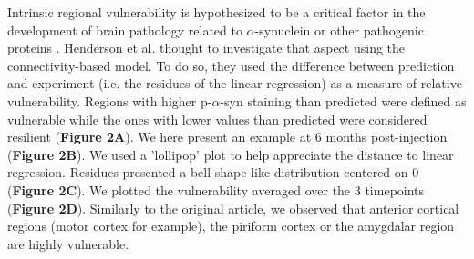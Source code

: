 Intrinsic regional vulnerability is hypothesized to be a critical factor in the development of brain pathology related to $\alpha$-synuclein or other pathogenic proteins \cite{Fu_2018}. Henderson et al. thought to investigate that aspect using the connectivity-based model. To do so, they used the difference between prediction and experiment (i.e. the residues of the linear regression) as a measure of relative vulnerability. Regions with higher p-$\alpha$-syn staining than predicted were defined as vulnerable while the ones with lower values than predicted were considered resilient (\textbf{Figure 2A}). We here present an example at 6 months post-injection (\textbf{Figure 2B}). We used a 'lollipop' plot to help appreciate the distance to linear regression. Residues presented a bell shape-like distribution centered on 0 (\textbf{Figure 2C}). We plotted the vulnerability averaged over the 3 timepoints (\textbf{Figure 2D}). Similarly to the original article, we observed that anterior cortical regions (motor cortex for example), the piriform cortex or the amygdalar region are highly vulnerable. \\

